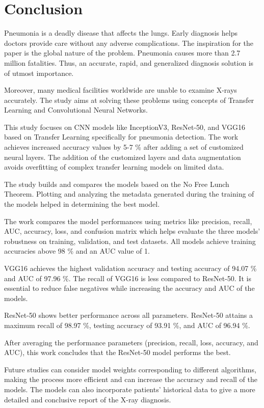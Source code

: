 \documentclass[conference]{IEEEtran}
\begin{document}
\section{Conclusion}
Pneumonia is a deadly disease that affects the lungs. Early diagnosis helps doctors provide care without any adverse complications. The inspiration for the paper is the global nature of the problem. Pneumonia causes more than 2.7 million fatalities. Thus, an accurate, rapid, and generalized diagnosis solution is of utmost importance.

Moreover, many medical facilities worldwide are unable to examine X-rays accurately. The study aims at solving these problems using concepts of Transfer Learning and Convolutional Neural Networks.

This study focuses on CNN models like InceptionV3, ResNet-50, and VGG16 based on Transfer Learning specifically for pneumonia detection. The work achieves increased accuracy values by 5-7 \% after adding a set of customized neural layers. The addition of the customized layers and data augmentation avoids overfitting of complex transfer learning models on limited data. 

The study builds and compares the models based on the No Free Lunch Theorem. Plotting and analyzing the metadata generated during the training of the models helped in determining the best model.

The work compares the model performances using metrics like precision, recall, AUC, accuracy, loss, and confusion matrix which helps evaluate the three models’ robustness on training, validation, and test datasets. All models achieve training accuracies above 98 \% and an AUC value of 1. 

VGG16 achieves the highest validation accuracy and testing accuracy of 94.07 \% and AUC  of 97.96 \%. The recall of VGG16 is less compared to ResNet-50. It is essential to reduce false negatives while increasing the accuracy and AUC of the models. 

ResNet-50 shows better performance across all parameters. ResNet-50 attains a maximum recall of 98.97 \%, testing accuracy of  93.91 \%, and AUC of 96.94 \%.
  
After averaging the performance parameters (precision, recall, loss, accuracy, and AUC), this work concludes that the ResNet-50 model performs the best.

Future studies can consider model weights corresponding to different algorithms, making the process more efficient and can increase the accuracy and recall of the models. The models can also incorporate patients’ historical data to give a more detailed and conclusive report of the X-ray diagnosis.
\end{document}
